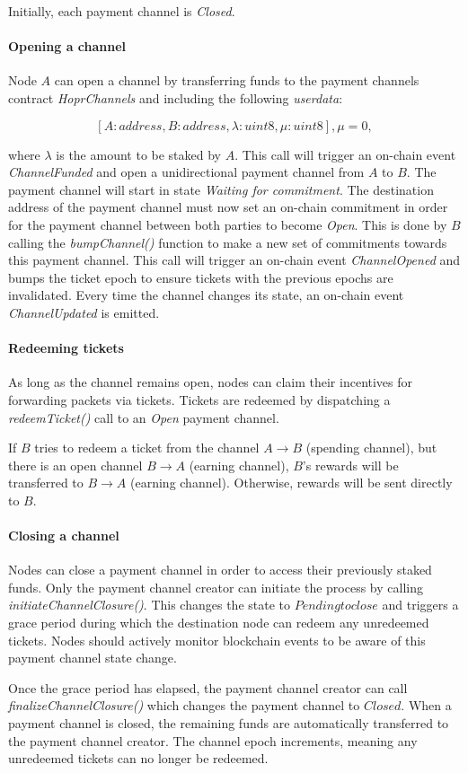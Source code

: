 Initially, each payment channel is \textit{Closed}.

\paragraph{Opening a channel} Node $A$ can open a channel by transferring funds to the payment channels contract \textit{HoprChannels} and including the following \textit{userdata}:

$$[A: address, B: address, \lambda: uint8, \mu: uint8], \mu = 0,$$

where $\lambda$ is the amount to be staked by $A$. This call will trigger an on-chain event \textit{ChannelFunded} and open a unidirectional payment channel from $A$ to $B$. The payment channel will start in state \textit{Waiting for commitment}. The destination address of the payment channel must now set an on-chain commitment in order for the payment channel between both parties to become \textit{Open}. This is done by $B$ calling the \textit{bumpChannel()} function to make a new set of commitments towards this payment channel. This call will trigger an on-chain event \textit{ChannelOpened} and bumps the ticket epoch to ensure tickets with the previous epochs are invalidated. Every time the channel changes its state, an on-chain event \textit{ChannelUpdated} is emitted.

\paragraph{Redeeming tickets}
As long as the channel remains open, nodes can claim their incentives for forwarding packets via tickets. Tickets are redeemed by dispatching a \textit{redeemTicket()} call to an \textit{Open} payment channel.

If $B$ tries to redeem a ticket from the channel $A\rightarrow B$ (spending channel), but there is an open channel $B\rightarrow A$ (earning channel), $B$'s rewards will be transferred to $B\rightarrow A$ (earning channel). Otherwise, rewards will be sent directly to $B$.

\paragraph{Closing a channel}
Nodes can close a payment channel in order to access their previously staked funds. Only the payment channel creator can initiate the process by calling \textit{initiateChannelClosure()}. This changes the state to $Pending to close$ and triggers a grace period during which the destination node can redeem any unredeemed tickets. Nodes should actively monitor blockchain events to be aware of this payment channel state change.

Once the grace period has elapsed, the payment channel creator can call \textit{finalizeChannelClosure()} which changes the payment channel to $Closed$. When a payment channel is closed, the remaining funds are automatically transferred to the payment channel creator. The channel epoch increments, meaning any unredeemed tickets can no longer be redeemed.

